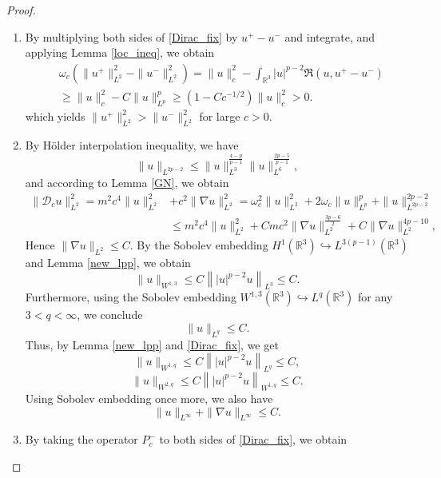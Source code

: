 \documentclass{amsart}
\theoremstyle{plain}
\theoremstyle{definition}
\theoremstyle{remark}
\numberwithin{equation}{section} \numberwithin{figure}{section}
\begin{document}
\begin{proof}
  \begin{enumerate}
    \item [(1)] By multiplying both sides of \eqref{Dirac_fix} by $u^+ - u^-$
    and integrate, and applying Lemma \ref{loc_ineq}, we obtain
      \begin{equation*}
        \begin{split}
          &\omega_c(\|u^+\|_{L^2}^2-\|u ^-\|_{L^2}^2 ) = \|u \|_{c}^2 - \int_{\mathbb{R}^3}|u |^{p-2}\Re(u , u ^+- u ^-)\\
          &\geq \|u \|_{c}^2 - C\|u \|_{L^p}^p \geq (1-Cc^{-1/2})\|u\|_c ^2 >0.
        \end{split}
      \end{equation*}
      which yields $\|u^+\|_{L^2}^2>\|u^-\|_{L^2}^2$ for large $c>0$.
    \item [(2)] By Hölder interpolation inequality, we have
    $$
    \|u\|_{L^{2p-2}}\leq \|u\|_{L^3}^{\frac{4-p}{p-1}}\|u\|_{L^6}^{\frac{2p-5}{p-1}},
    $$
   and according to Lemma \ref{GN}, we obtain
   \begin{equation*}
       \begin{split}
           \|\mathscr{D}_c u\|_{L^2}^2= m^2 c^4\|u\|_{L^2}^2 &+
           c^2\|\nabla u\|_{L^2}^2=\omega_c^2\|u\|_{L^2}^2 +2\omega_c\|u\|_{L^p}^p + \|u\|_{L^{2p-2}}^{2p-2}\\
           &\leq m^2 c^4\|u\|_{L^2}^2 + C mc^2\| \nabla  u\|_{L^2}^{\frac{3p-6}{2}} + C\|\nabla u\|_{L^2}^{4p-10},
       \end{split}
   \end{equation*}
   Hence $\|\nabla u\|_{L^2}\leq C$.  
    By the Sobolev embedding \(H^1(\mathbb{R}^3) \hookrightarrow L^{3(p-1)}(\mathbb{R}^3)\) and Lemma \ref{new_lpp},
     we obtain
    \[
    \|u\|_{W^{1,3}} \leq C \left\| |u|^{p-2}u \right\|_{L^3} \leq C.
    \]
    Furthermore, using the Sobolev embedding \(W^{1,3}(\mathbb{R}^3) \hookrightarrow L^q(\mathbb{R}^3)\) for any \(3 < q < \infty\), we conclude
    \[
    \|u\|_{L^q} \leq C.
    \]
    Thus, by Lemma \ref{new_lpp} and \eqref{Dirac_fix}, we get
    \[
    \|u\|_{W^{1,q}} \leq C \left\| |u|^{p-2}u \right\|_{L^q} \leq C,
    \]
    \[
    \|u\|_{W^{2,q}} \leq C \left\| |u|^{p-2}u \right\|_{W^{1,q}} \leq C.
    \]
    Using Sobolev embedding once more, we also have
    \[
    \|u\|_{L^\infty} + \|\nabla u\|_{L^\infty} \leq C.
    \]
    \item[(3)] By taking the operator $P_c^-$ to both sides of \eqref{Dirac_fix}, we obtain
    $$
$$
\end{enumerate}
\end{proof}
\end{document}
